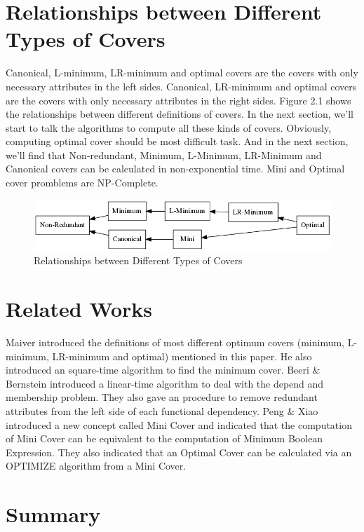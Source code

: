 \documentclass[11pt]{book}
\begin{document}
\section{Relationships between Different Types of Covers}

Canonical, L-minimum, LR-minimum and optimal covers are the covers with only necessary attributes in the left sides. Canonical, LR-minimum and optimal covers are the covers with only necessary attributes in the right sides. Figure 2.1 shows the relationships between different definitions of covers. In the next section, we'll start to talk the algorithms to compute all these kinds of covers. Obviously, computing optimal cover should be most difficult task. And in the next section, we'll find that Non-redundant, Minimum, L-Minimum, LR-Minimum and Canonical covers can be calculated in non-exponential time. Mini and Optimal cover promblems are NP-Complete.

\begin{figure}
	\centering
	\includegraphics[width=\textwidth]{./diagrams/types-of-covers.png}
	\caption{Relationships between Different Types of Covers}
\end{figure}

\section{Related Works}

Maiver \cite{maier1980minimum} introduced the definitions of most different optimum covers (minimum, L-minimum, LR-minimum and optimal) mentioned in this paper. He also introduced an square-time algorithm to find the minimum cover. Beeri \& Bernstein \cite{beeri1979computational} introduced a linear-time algorithm to deal with the depend and membership problem. They also gave an procedure to remove redundant attributes from the left side of each functional dependency. Peng \& Xiao \cite{peng2016optimal} introduced a new concept called Mini Cover and indicated that the computation of Mini Cover can be equivalent to the computation of Minimum Boolean Expression. They also indicated that an Optimal Cover can be calculated via an OPTIMIZE algorithm from a Mini Cover.

\section{Summary}
\end{document}
